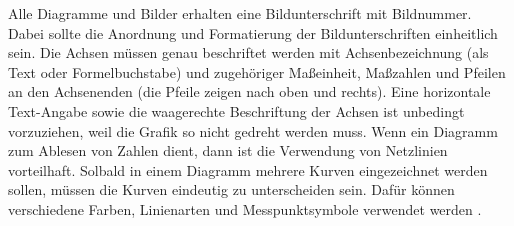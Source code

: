 \noindent
Alle Diagramme und Bilder erhalten eine Bildunterschrift mit Bildnummer.
Dabei sollte die Anordnung und Formatierung der Bildunterschriften einheitlich sein.
Die Achsen müssen genau beschriftet werden mit Achsenbezeichnung (als Text oder Formelbuchstabe) und zugehöriger Maßeinheit, Maßzahlen und Pfeilen an den Achsenenden (die Pfeile zeigen nach oben und rechts).
Eine horizontale Text-Angabe sowie die waagerechte Beschriftung der Achsen ist unbedingt vorzuziehen, weil die Grafik so nicht gedreht werden muss.
Wenn ein Diagramm zum Ablesen von Zahlen dient, dann ist die Verwendung von Netzlinien vorteilhaft.
Solbald in einem Diagramm mehrere Kurven eingezeichnet werden sollen, müssen die Kurven eindeutig zu unterscheiden sein.
Dafür können verschiedene Farben, Linienarten und Messpunktsymbole verwendet werden \cite[S.~85~ff.]{Hering2009}.